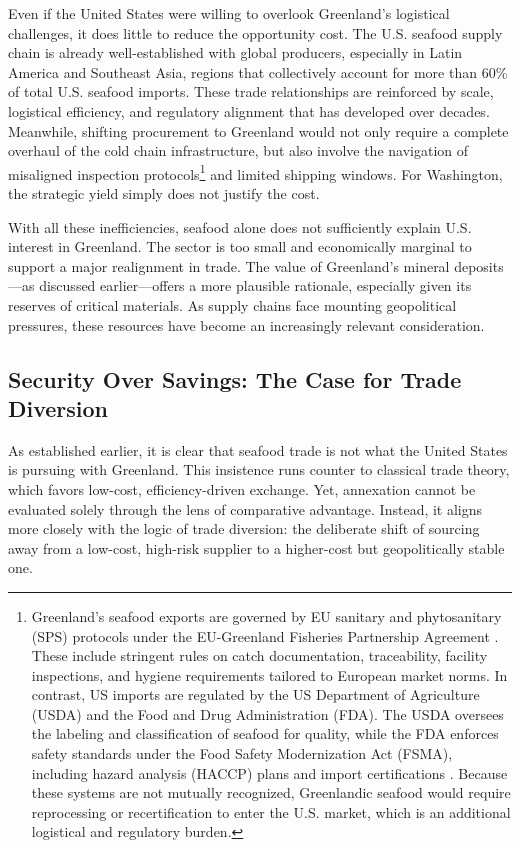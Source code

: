 \documentclass{adonis}
\begin{document}
    Even if the United States were willing to overlook Greenland’s logistical challenges, it does little to reduce the opportunity cost. The U.S. seafood supply chain is already well-established with global producers, especially in Latin America and Southeast Asia, regions that collectively account for more than 60\% of total U.S. seafood imports. These trade relationships are reinforced by scale, logistical efficiency, and regulatory alignment that has developed over decades. Meanwhile, shifting procurement to Greenland would not only require a complete overhaul of the cold chain infrastructure, but also involve the navigation of misaligned inspection protocols\footnote{Greenland’s seafood exports are governed by EU sanitary and phytosanitary (SPS) protocols under the EU-Greenland Fisheries Partnership Agreement \citep{eufisheries2024greenland}. These include stringent rules on catch documentation, traceability, facility inspections, and hygiene requirements tailored to European market norms. In contrast, US imports are regulated by the US Department of Agriculture (USDA) and the Food and Drug Administration (FDA). The USDA oversees the labeling and classification of seafood for quality, while the FDA enforces safety standards under the Food Safety Modernization Act (FSMA), including hazard analysis (HACCP) plans and import certifications \citep{fda2025seafood}. Because these systems are not mutually recognized, Greenlandic seafood would require reprocessing or recertification to enter the U.S. market, which is an additional logistical and regulatory burden.} and limited shipping windows. For Washington, the strategic yield simply does not justify the cost.

    With all these inefficiencies, seafood alone does not sufficiently explain U.S. interest in Greenland. The sector is too small and economically marginal to support a major realignment in trade. The value of Greenland’s mineral deposits—as discussed earlier—offers a more plausible rationale, especially given its reserves of critical materials. As supply chains face mounting geopolitical pressures, these resources have become an increasingly relevant consideration.

    \subsection*{Security Over Savings: The Case for Trade Diversion}

    As established earlier, it is clear that seafood trade is not what the United States is pursuing with Greenland. This insistence runs counter to classical trade theory, which favors low-cost, efficiency-driven exchange. Yet, annexation cannot be evaluated solely through the lens of comparative advantage. Instead, it aligns more closely with the logic of trade diversion: the deliberate shift of sourcing away from a low-cost, high-risk supplier to a higher-cost but geopolitically stable one. 
\end{document}
